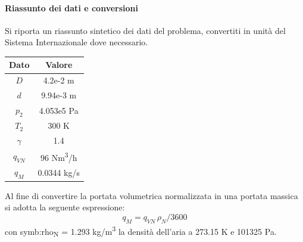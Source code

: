 \paragraph{Riassunto dei dati e conversioni}
Si riporta un riassunto sintetico dei dati del problema, convertiti in unità del Sistema Internazionale dove necessario.
\begin{table}[H]
	\centering
	\begin{tabular}{c|c}
			\toprule
			\toprule
			\textbf{Dato} & \textbf{Valore} \\
			\midrule
			\midrule
			$D$ & 4.2e-2 m \\
			\midrule
			$d$ & 9.94e-3 m \\
			\midrule
			$p_2$ & 4.053e5 Pa\\
			\midrule
			$T_2$ & 300 K\\
			\midrule
			$\gamma $ & 1.4 \\
			\midrule
			$q_{\textit{VN}}$ & 96 Nm\textsuperscript{3}/h	\\
			\midrule
			$q_M$ & 0.0344 kg/s\\
			\bottomrule
			\bottomrule
	\end{tabular}
\end{table}
Al fine di convertire la portata volumetrica normalizzata in una portata massica si adotta la seguente espressione: 
\begin{equation}
	q_M = q_{\textit{VN}}\, \rho_N / 3600 
\end{equation}
con \gls{symb:rho}\textsubscript{N} = 1.293 kg/m\textsuperscript{3} la densità dell'aria a 273.15 K e 101325 Pa.


